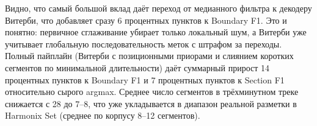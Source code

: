 Видно, что самый большой вклад даёт переход от медианного фильтра к декодеру Витерби, что добавляет сразу 6 процентных пунктов к Boundary F1. Это и понятно: первичное сглаживание убирает только локальный шум, а Витерби уже учитывает глобальную последовательность меток с штрафом за переходы. Полный пайплайн (Витерби с позиционными приорами и слиянием коротких сегментов по минимальной длительности) даёт суммарный прирост 14 процентных пунктов к Boundary F1 и 7 процентных пунктов к Section F1 относительно сырого argmax. Среднее число сегментов в трёхминутном треке снижается с 28 до 7--8, что уже укладывается в диапазон реальной разметки в Harmonix Set (среднее по корпусу 8--12 сегментов).
